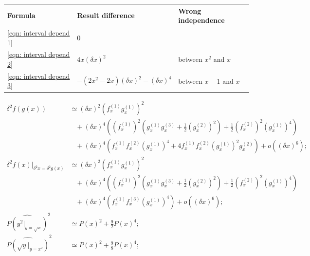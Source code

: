 \documentclass[twoside]{article}
\numberwithin{equation}{section}
\newcommand{\eqspace}{\;\;\;}
\begin{document}
\begin{table}
\centering
\begin{tabular}{|l|l|l|} 
\hline 
Formula & Result difference & Wrong independence \\ 
\hline 
\eqref{eqn: interval depend 1} & $0$ & \\
\hline 
\eqref{eqn: interval depend 2} & $4 x (\delta x)^2$ & between $x^2$ and $x$ \\
\hline 
\eqref{eqn: interval depend 3} & $-(2 x^2 - 2 x) (\delta x)^2 - (\delta x)^4$ & between $x-1$ and $x$ \\
\hline 
\end{tabular}
\label{tbl: dependency example}
\end{table}

\begin{align}
\label{eqn: composite variance 1d}
\delta^2 f(g(x)) &\simeq (\delta x)^2 (f^{(1)}_x g^{(1)}_x)^2 \\
  &\eqspace + (\delta x)^4 \left( (f^{(1)}_x)^2 (g^{(1)}_x g^{(3)}_x + \frac{1}{2}(g^{(2)}_x)^2) + \frac{1}{2} (f^{(2)}_x)^2 (g^{(1)}_x)^4 \right) \nonumber \\
  &\eqspace + (\delta x)^4 \left( f^{(1)}_x f^{(2)}_x (g^{(1)}_x)^4 + 4 f^{(1)}_x f^{(2)}_x (g^{(1)}_x)^2 g^{(2)}_x \right) + o((\delta x)^6);  \nonumber\\
\label{eqn: progressive variance}
\delta^2 f(x)|_{\delta^2 x = \delta^2 g(x)} &\simeq (\delta x)^2 (f^{(1)}_x g^{(1)}_x)^2 \\
  &\eqspace + (\delta x)^4 \left( (f^{(1)}_x)^2 (g^{(1)}_x g^{(3)}_x + \frac{1}{2}(g^{(2)}_x)^2) + \frac{1}{2} (f^{(2)}_x)^2 (g^{(1)}_x)^4 \right) \nonumber \\
  &\eqspace + (\delta x)^4 \left( f^{(1)}_x f^{(3)}_x (g^{(1)}_x)^4 \right) + o((\delta x)^6);  \nonumber \\
\label{eqn: square of square root}
\widehat{P(y^2|_{y=\sqrt{x}})}^2 & \simeq P(x)^2 + \frac{9}{2} P(x)^4; \\
\label{eqn: square root of square}
\widehat{P(\sqrt{y}|_{y=x^2})}^2 & \simeq P(x)^2 + \frac{9}{8} P(x)^4;
\end{align}
\end{document}
